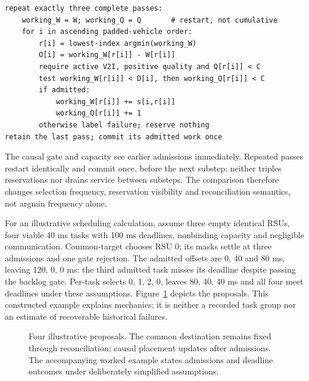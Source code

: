 \documentclass[11pt,a4paper]{article}
\begin{document}
\begin{algorithm}[htbp]
\caption{causal per-task placement with gate (one substep)}\label{alg:2}
\begin{Verbatim}[fontsize=\small,breaklines=true]
repeat exactly three complete passes:
    working_W = W; working_Q = Q       # restart, not cumulative
    for i in ascending padded-vehicle order:
        r[i] = lowest-index argmin(working_W)
        O[i] = working_W[r[i]] - W[r[i]]
        require active V2I, positive quality and Q[r[i]] < C
        test working_W[r[i]] < D[i], then working_Q[r[i]] < C
        if admitted:
            working_W[r[i]] += s[i,r[i]]
            working_Q[r[i]] += 1
        otherwise label failure; reserve nothing
retain the last pass; commit its admitted work once
\end{Verbatim}
\end{algorithm}

The causal gate and capacity see earlier admissions immediately. Repeated passes restart identically and commit once, before the next substep; neither triples reservations nor drains service between substeps. The comparison therefore changes selection frequency, reservation visibility and reconciliation semantics, not argmin frequency alone.

For an illustrative scheduling calculation, assume three empty identical RSUs, four viable 40 ms tasks with 100 ms deadlines, nonbinding capacity and negligible communication. Common-target chooses RSU 0; its masks settle at three admissions and one gate rejection. The admitted offsets are 0, 40 and 80 ms, leaving 120, 0, 0 ms: the third admitted task misses its deadline despite passing the backlog gate. Per-task selects 0, 1, 2, 0, leaves 80, 40, 40 ms and all four meet deadlines under these assumptions. Figure~\ref{fig:3} depicts the proposals. This constructed example explains mechanics; it is neither a recorded task group nor an estimate of recoverable historical failures.

\begin{figure}[htbp]
\centering

\caption{Four illustrative proposals. The common destination remains fixed through reconciliation; causal placement updates after admissions. The accompanying worked example states admissions and deadline outcomes under deliberately simplified assumptions.}\label{fig:3}
\end{figure}
\end{document}
